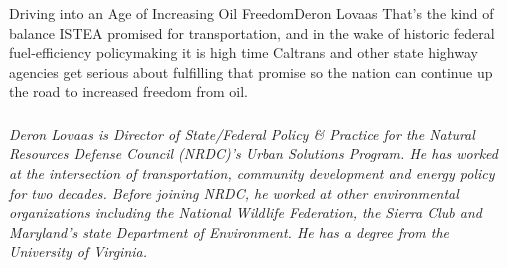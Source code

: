 \documentclass{papertex}
\begin{document}
\begin{news}{2}{Driving into an Age of Increasing Oil Freedom}{Deron Lovaas}{}{}
That’s the kind of balance ISTEA promised for transportation, and in the wake 
of historic federal fuel-efficiency policymaking it is high time Caltrans and 
other state highway agencies get serious about fulfilling that promise so the 
nation can continue up the road to increased freedom from oil.


\subsubsection*{}

\emph{Deron Lovaas is Director of State/Federal Policy \& Practice for the 
Natural Resources Defense Council (NRDC)’s Urban Solutions Program. He has 
worked at the intersection of transportation, community development and energy 
policy for two decades. Before joining NRDC, he worked at other environmental 
organizations including the National Wildlife Federation, the Sierra Club and 
Maryland’s state Department of Environment. He has a degree from the University 
of Virginia.}

\end{news}
\end{document}
